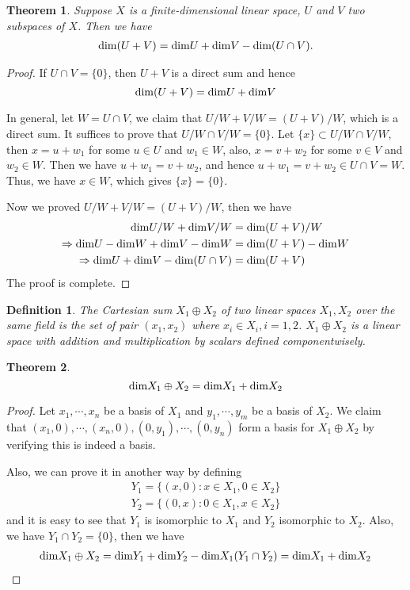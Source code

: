 \documentclass[11pt]{book}
\newtheorem{definition}{Definition}[section]
\newtheorem{theorem}{Theorem}[section]
\theoremstyle{definition}
\numberwithin{equation}{subsection}
\begin{document}
\medskip

\begin{theorem}
Suppose $X$ is a finite-dimensional linear space, $U$ and $V$ two subspaces of $X$. Then we have
\begin{align*}
    {\rm dim}(U+V) = {\rm dim}U + {\rm dim}V - {\rm dim}(U\cap V).
\end{align*}
\end{theorem}
\begin{proof}
If $U\cap V = \{0\}$, then $U+V$ is a direct sum and hence 
$${\rm dim}(U+V) = {\rm dim}U + {\rm dim}V $$

In general, let $W = U\cap V$, we claim that $U/W+V/W = (U+V)/W$, which is a direct sum. It suffices to prove that $U/W\cap V/W = \{0\}$. Let $\{x\}\subset U/W\cap V/W$, then $x = u+w_1$ for some $u\in U$ and $w_1\in W$, also, $x = v+w_2$ for some $v\in V$ and $w_2\in W$. Then we have $u+w_1 = v+w_2$, and hence $u+w_1 = v+w_2\in U\cap V = W$. Thus, we have $x\in W$, which gives $\{x\} = \{0\}$.

Now we proved $U/W+V/W = (U+V)/W$, then we have 
\begin{align*}
    {\rm dim}U/W + {\rm dim}V/W & = {\rm dim}(U+V)/W \\
    \Rightarrow {\rm dim}U - {\rm dim} W + {\rm dim} V - {\rm dim}W & = {\rm dim}(U+V) - {\rm dim}W\\ 
    \Rightarrow {\rm dim}U + {\rm dim} V - {\rm dim}(U\cap V) & = {\rm dim}(U+V)
\end{align*}
The proof is complete.
\end{proof}

\medskip

\begin{definition}
The Cartesian sum $X_1\oplus X_2$ of two linear spaces $X_1, X_2$ over the same field is the set of pair $(x_1,x_2)$ where $x_i\in X_i, i = 1,2$. $X_1\oplus X_2$ is a linear space with addition and multiplication by scalars defined componentwisely. 
\end{definition}

\medskip

\begin{theorem}
$${\rm dim}X_1\oplus X_2 = {\rm dim}X_1 + {\rm dim}X_2$$
\end{theorem}
\begin{proof}
Let $x_1, \cdots, x_n$ be a basis of $X_1$ and $y_1, \cdots, y_m$ be a basis of $X_2$. We claim that $(x_1,0),\cdots, (x_n,0), (0,y_1), \cdots, (0,y_n)$ form a basis for $X_1\oplus X_2$ by verifying this is indeed a basis.

Also, we can prove it in another way by defining
\begin{align*}
    Y_1 = \{(x,0): x\in X_1, 0\in X_2\} \\
    Y_2 = \{(0,x): 0\in X_1, x\in X_2\}
\end{align*}
and it is easy to see that $Y_1$ is isomorphic to $X_1$ and $Y_2$ isomorphic to $X_2$. Also, we have $Y_1\cap Y_2 = \{0\}$, then we have 
\begin{align*}
    {\rm dim}X_1\oplus X_2 = {\rm dim}Y_1 + {\rm dim}Y_2 - {\rm dim}X_1(Y_1\cap Y_2) = {\rm dim}X_1 + {\rm dim}X_2
\end{align*}
\end{proof}
\end{document}
